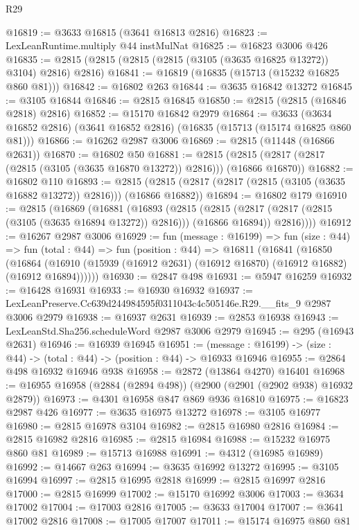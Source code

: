 \begin{lexlean}{R29}
\begin{coremodule}
@16819 := @3633 @16815 (@3641 @16813 @2816)
@16823 := LexLeanRuntime.multiply @44 instMulNat
@16825 := @16823 @3006 @426
@16835 := @2815 (@2815 (@2815 (@2815 (@3105 (@3635 @16825 @13272)) @3104) @2816) @2816)
@16841 := @16819 (@16835 (@15713 (@15232 @16825 @860 @81)))
@16842 := @16802 @263
@16844 := @3635 @16842 @13272
@16845 := @3105 @16844
@16846 := @2815 @16845
@16850 := @2815 (@2815 (@16846 @2818) @2816)
@16852 := @15170 @16842 @2979
@16864 := @3633 (@3634 @16852 @2816) (@3641 @16852 @2816) (@16835 (@15713 (@15174 @16825 @860 @81)))
@16866 := @16262 @2987 @3006
@16869 := @2815 (@11448 (@16866 @2631))
@16870 := @16802 @50
@16881 := @2815 (@2815 (@2817 (@2817 (@2815 (@3105 (@3635 @16870 @13272)) @2816))) (@16866 @16870))
@16882 := @16802 @110
@16893 := @2815 (@2815 (@2817 (@2817 (@2815 (@3105 (@3635 @16882 @13272)) @2816))) (@16866 @16882))
@16894 := @16802 @179
@16910 := @2815
    (@16869
      (@16881
        (@16893
          (@2815
            (@2815 (@2817 (@2817 (@2815 (@3105 (@3635 @16894 @13272)) @2816))) (@16866 @16894))
            @2816))))
@16912 := @16267 @2987 @3006
@16929 := fun (message : @16199) =>
  fun (size : @44) =>
  fun (total : @44) =>
  fun (position : @44) =>
  @16811
    (@16841
      (@16850
        (@16864 (@16910 (@15939 (@16912 @2631) (@16912 @16870) (@16912 @16882) (@16912 @16894))))))
@16930 := @2847 @498
@16931 := @5947 @16259
@16932 := @16428 @16931
@16933 := @16930 @16932
@16937 := LexLeanPreserve.Cc639d244984595f0311043c4c505146e.R29.__fits_9 @2987 @3006 @2979
@16938 := @16937 @2631
@16939 := @2853 @16938
@16943 := LexLeanStd.Sha256.scheduleWord @2987 @3006 @2979
@16945 := @295 (@16943 @2631)
@16946 := @16939 @16945
@16951 := (message : @16199) -> (size : @44) -> (total : @44) -> (position : @44) -> @16933 @16946
@16955 := @2864 @498 @16932 @16946 @938
@16958 := @2872 (@13864 @4270) @16401
@16968 := @16955 @16958 (@2884 (@2894 @498)) (@2900 (@2901 (@2902 @938) @16932 @2879))
@16973 := @4301 @16958 @847 @869 @936 @16810
@16975 := @16823 @2987 @426
@16977 := @3635 @16975 @13272
@16978 := @3105 @16977
@16980 := @2815 @16978 @3104
@16982 := @2815 @16980 @2816
@16984 := @2815 @16982 @2816
@16985 := @2815 @16984
@16988 := @15232 @16975 @860 @81
@16989 := @15713 @16988
@16991 := @4312 (@16985 @16989)
@16992 := @14667 @263
@16994 := @3635 @16992 @13272
@16995 := @3105 @16994
@16997 := @2815 @16995 @2818
@16999 := @2815 @16997 @2816
@17000 := @2815 @16999
@17002 := @15170 @16992 @3006
@17003 := @3634 @17002
@17004 := @17003 @2816
@17005 := @3633 @17004
@17007 := @3641 @17002 @2816
@17008 := @17005 @17007
@17011 := @15174 @16975 @860 @81

\end{coremodule}
\end{lexlean}

